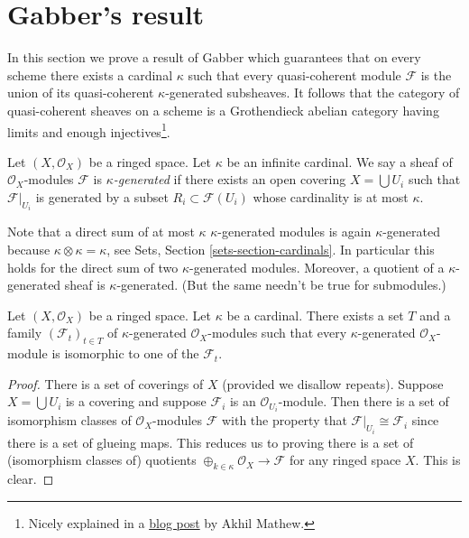 \section{Gabber's result}
\label{section-gabber}

\noindent
In this section we prove a result of Gabber which guarantees that on every
scheme there exists a cardinal $\kappa$ such that every quasi-coherent
module $\mathcal{F}$ is the union of its quasi-coherent
$\kappa$-generated subsheaves. It follows that the category of quasi-coherent
sheaves on a scheme is a Grothendieck abelian category having
limits and enough injectives\footnote{Nicely explained in a
\href{https://amathew.wordpress.com/2011/07/30/quasi-coherent-sheaves-presentable-categories-and-a-result-of-gabber/}{blog post}
by Akhil Mathew.}.

\begin{definition}
\label{definition-kappa-generated}
Let $(X, \mathcal{O}_X)$ be a ringed space. Let $\kappa$ be an infinite
cardinal. We say a sheaf of $\mathcal{O}_X$-modules $\mathcal{F}$ is
{\it $\kappa$-generated} if there exists an open covering
$X = \bigcup U_i$ such that $\mathcal{F}|_{U_i}$ is generated by
a subset $R_i \subset \mathcal{F}(U_i)$ whose cardinality is
at most $\kappa$.
\end{definition}

\noindent
Note that a direct sum of at most $\kappa$ $\kappa$-generated modules is
again $\kappa$-generated because $\kappa \otimes \kappa = \kappa$, see
Sets, Section \ref{sets-section-cardinals}.
In particular this holds for the direct sum of two $\kappa$-generated modules.
Moreover, a quotient of a $\kappa$-generated sheaf is $\kappa$-generated.
(But the same needn't be true for submodules.)

\begin{lemma}
\label{lemma-set-of-iso-classes}
Let $(X, \mathcal{O}_X)$ be a ringed space. Let $\kappa$ be a cardinal.
There exists a set $T$ and a family $(\mathcal{F}_t)_{t \in T}$ of
$\kappa$-generated $\mathcal{O}_X$-modules such that every $\kappa$-generated
$\mathcal{O}_X$-module is isomorphic to one of the $\mathcal{F}_t$.
\end{lemma}

\begin{proof}
There is a set of coverings of $X$ (provided we disallow repeats).
Suppose $X = \bigcup U_i$ is a covering and suppose $\mathcal{F}_i$
is an $\mathcal{O}_{U_i}$-module. Then there is a set of isomorphism
classes of $\mathcal{O}_X$-modules $\mathcal{F}$ with the property
that $\mathcal{F}|_{U_i} \cong \mathcal{F}_i$ since there is a set of
glueing maps. This reduces us to proving there is a set of (isomorphism
classes of) quotients
$\oplus_{k \in \kappa} \mathcal{O}_X \to \mathcal{F}$
for any ringed space $X$. This is clear.
\end{proof}

